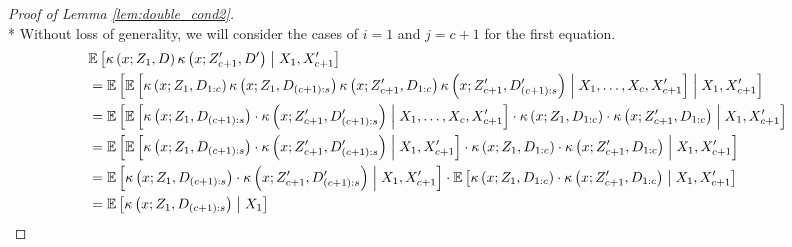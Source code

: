 \begin{proof}[Proof of Lemma \ref{lem:double_cond2}]\mbox{}\\*
    Without loss of generality, we will consider the cases of $i = 1$ and $j = c + 1$ for the first equation.
    \begin{equation}
    \begin{aligned}
        & \E\left[\kappa\left(x; Z_{1}, D\right)\kappa\left(x; Z_{c+1}^{\prime}, D^{\prime}\right) \; \middle| \; X_1, X_{c+1}^{\prime}\right]\\
        & = \E\left[
                \E\left[
                    \kappa\left(x; Z_{1}, D_{1:c}\right)
                    \kappa\left(x; Z_{1}, D_{(c+1):s}\right)
                    \kappa\left(x; Z_{c+1}^{\prime}, D_{1:c}\right) 
                    \kappa\left(x; Z_{c+1}^{\prime}, D^{\prime}_{(c+1):s}\right) 
                \; \middle| \; X_1, \dotsc, X_{c}, X_{c+1}^{\prime}\right] 
            \; \middle| \; X_1, X_{c+1}^{\prime}\right] \\
        & = \E\left[
                \E\left[
                    \kappa\left(x; Z_{1}, D_{(c+1):s}\right)
                    \cdot \kappa\left(x; Z_{c+1}^{\prime}, D^{\prime}_{(c+1):s}\right)
                \; \middle| \; X_1, \dotsc, X_{c}, X_{c+1}^{\prime}\right] 
                \cdot \kappa\left(x; Z_{1}, D_{1:c}\right)
                \cdot \kappa\left(x; Z_{c+1}^{\prime}, D_{1:c}\right)
            \; \middle| \; X_1, X_{c+1}^{\prime}\right] \\
        & = \E\left[
                \E\left[
                    \kappa\left(x; Z_{1}, D_{(c+1):s}\right)
                    \cdot \kappa\left(x; Z_{c+1}^{\prime}, D^{\prime}_{(c+1):s}\right)
                \; \middle| \; X_1, X_{c+1}^{\prime}\right] 
                \cdot \kappa\left(x; Z_{1}, D_{1:c}\right)
                \cdot \kappa\left(x; Z_{c+1}^{\prime}, D_{1:c}\right)
            \; \middle| \; X_1, X_{c+1}^{\prime}\right] \\
        & = \E\left[
                    \kappa\left(x; Z_{1}, D_{(c+1):s}\right)
                    \cdot \kappa\left(x; Z_{c+1}^{\prime}, D^{\prime}_{(c+1):s}\right)
            \; \middle| \; X_1, X_{c+1}^{\prime}\right] 
            \cdot \E\left[
                \kappa\left(x; Z_{1}, D_{1:c}\right)
                \cdot \kappa\left(x; Z_{c+1}^{\prime}, D_{1:c}\right)
            \; \middle| \; X_1, X_{c+1}^{\prime}\right] \\
        & = \E\left[\kappa\left(x; Z_{1}, D_{(c+1):s}\right)\; \middle| \; X_1\right] 

\end{aligned}
\end{equation}
\end{proof}
